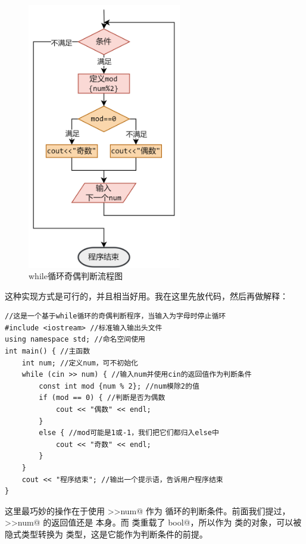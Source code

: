 \begin{figure}[htbp]
    \centering
    \includegraphics[width=0.6\textwidth]{../images/generalized_parts/03_structure_of_odd_or_even_with_while_loop_300.png}
    \caption{while循环奇偶判断流程图}
\end{figure}
这种实现方式是可行的，并且相当好用。我在这里先放代码，然后再做解释：
\begin{lstlisting}[caption=\texttt{while循环奇偶判断.cpp},label=lst:OddOrEvenWithWhileLoop]
//这是一个基于while循环的奇偶判断程序，当输入为字母时停止循环
#include <iostream> //标准输入输出头文件
using namespace std; //命名空间使用
int main() { //主函数
    int num; //定义num，可不初始化
    while (cin >> num) { //输入num并使用cin的返回值作为判断条件
        const int mod {num % 2}; //num模除2的值
        if (mod == 0) { //判断是否为偶数
            cout << "偶数" << endl;
        }
        else { //mod可能是1或-1，我们把它们都归入else中
            cout << "奇数" << endl;
        }
    }
    cout << "程序结束"; //输出一个提示语，告诉用户程序结束
}
\end{lstlisting}
这里最巧妙的操作在于使用 \lstinline@cin>>num@ 作为 \lstinline@while@ 循环的判断条件。前面我们提过，\lstinline@cin>>num@ 的返回值还是 \lstinline@cin@ 本身。而 \lstinline@ostream@ 类重载了 \lstinline@operator bool@，所以作为 \lstinline@ostream@ 类的对象，\lstinline@cin@ 可以被隐式类型转换为 \lstinline@bool@ 类型，这是它能作为判断条件的前提。\par

